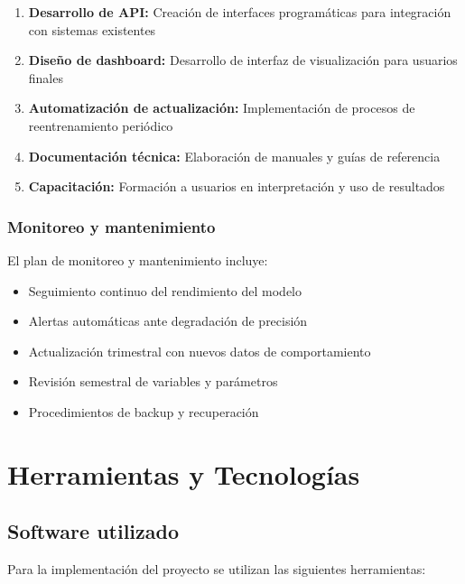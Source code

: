 \begin{enumerate}
    \item \textbf{Desarrollo de API:} Creación de interfaces programáticas para integración con sistemas existentes
    \item \textbf{Diseño de dashboard:} Desarrollo de interfaz de visualización para usuarios finales
    \item \textbf{Automatización de actualización:} Implementación de procesos de reentrenamiento periódico
    \item \textbf{Documentación técnica:} Elaboración de manuales y guías de referencia
    \item \textbf{Capacitación:} Formación a usuarios en interpretación y uso de resultados
\end{enumerate}

\subsubsection{Monitoreo y mantenimiento}
El plan de monitoreo y mantenimiento incluye:

\begin{itemize}
    \item Seguimiento continuo del rendimiento del modelo
    \item Alertas automáticas ante degradación de precisión
    \item Actualización trimestral con nuevos datos de comportamiento
    \item Revisión semestral de variables y parámetros
    \item Procedimientos de backup y recuperación
\end{itemize}

\section{Herramientas y Tecnologías}
\subsection{Software utilizado}
Para la implementación del proyecto se utilizan las siguientes herramientas:

